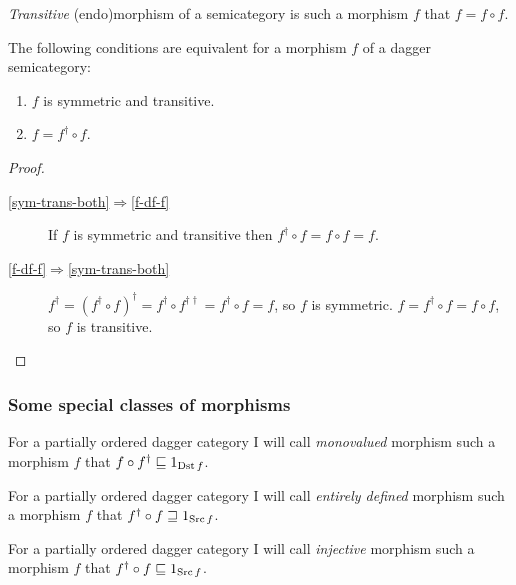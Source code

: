\begin{defn}
\emph{Transitive} (endo)morphism of a
semicategory is such a morphism $f$ that $f=f\circ f$.\end{defn}
\begin{thm}
\label{sym-trans}The following conditions are equivalent for a morphism
$f$ of a dagger semicategory:
\begin{enumerate}
\item \label{sym-trans-both}$f$ is symmetric and transitive.
\item \label{f-df-f}$f=f^{\dagger}\circ f$.
\end{enumerate}
\end{thm}
\begin{proof}
~
\begin{description}
\item [{\ref{sym-trans-both}$\Rightarrow$\ref{f-df-f}}] If $f$ is symmetric
and transitive then $f^{\dagger}\circ f=f\circ f=f$.
\item [{\ref{f-df-f}$\Rightarrow$\ref{sym-trans-both}}] $f^{\dagger}=(f^{\dagger}\circ f)^{\dagger}=f^{\dagger}\circ f^{\dagger\dagger}=f^{\dagger}\circ f=f$,
so $f$ is symmetric. $f=f^{\dagger}\circ f=f\circ f$, so $f$ is
transitive.
\end{description}
\end{proof}

\subsubsection{Some special classes of morphisms}\label{sec-ordered-morphism-classes}
\begin{defn}
For a partially ordered dagger category
I will call \emph{monovalued} morphism such a morphism $f$ that $f\circ f^{\dagger}\sqsubseteq1_{\operatorname{Dst} f}$.
\end{defn}

\begin{defn}
For a partially ordered dagger category
I will call \emph{entirely defined} morphism such a morphism $f$
that $f^{\dagger}\circ f\sqsupseteq1_{\operatorname{Src} f}$.
\end{defn}

\begin{defn}
For a partially ordered dagger category
I will call \emph{injective} morphism such a morphism $f$ that $f^{\dagger}\circ f\sqsubseteq1_{\operatorname{Src} f}$.
\end{defn}

